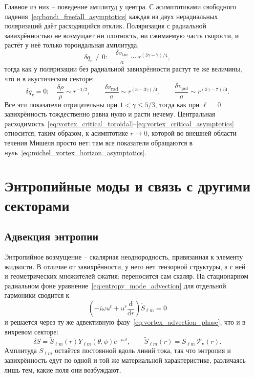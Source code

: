 \documentclass[12pt,a4paper,preprint,nopreprintline]{elsarticle}
\begin{document}
Главное из них -- поведение амплитуд у центра. С асимптотиками свободного падения~\eqref{eq:bondi_freefall_asymptotics} каждая из двух нерадиальных поляризаций даёт расходящийся отклик. Поляризация с радиальной завихрённостью не возмущает ни плотность, ни сжимаемую часть скорости, и растёт у неё только тороидальная амплитуда,
\begin{equation}
    \delta q_{r}\neq0:
    \quad
    \frac{\delta v_{\mathrm{tor}}}{a}
    \sim r^{(3\gamma-7)/4},
    \label{eq:vortex_critical_toroidal}
\end{equation}
тогда как у поляризации без радиальной завихрённости растут те же величины, что и в акустическом секторе:
\begin{equation}
    \delta q_{r}=0:
    \quad
    \frac{\delta\rho}{\rho}
    \sim r^{-1/2},
    \qquad
    \frac{\delta v_{\mathrm{rad}}}{a}
    \sim r^{(3-3\gamma)/4},
    \qquad
    \frac{\delta v_{\mathrm{pol}}}{a}
    \sim r^{(3\gamma-7)/4}.
    \label{eq:vortex_critical_asymptotics}
\end{equation}
Все эти показатели отрицательны при $1<\gamma\leq5/3$, тогда как при $\ell=0$ завихрённость тождественно равна нулю и расти нечему. Центральная расходимость~\eqref{eq:vortex_critical_toroidal}--\eqref{eq:vortex_critical_asymptotics} относится, таким образом, к асимптотике $r\rightarrow0$, которой во внешней области течения Мишеля просто нет: там все показатели обращаются в нуль~\eqref{eq:michel_vortex_horizon_asymptotics}.

\section{Энтропийные моды и связь с другими секторами}
\label{sec:entropy}

\subsection{Адвекция энтропии}
\label{sec:entropy_advection}

Энтропийное возмущение -- скалярная неоднородность, привязанная к элементу жидкости. В отличие от завихрённости, у него нет тензорной структуры, а с ней и геометрических множителей сжатия: переносится сам скаляр. На стационарном радиальном фоне уравнение~\eqref{eq:entropy_mode_advection} для отдельной гармоники сводится к
\begin{equation}
    \left(
        -i\omega u^{t}+u^{r}\frac{\mathrm{d}}{\mathrm{d}r}
    \right)\widetilde{S}_{\ell m}=0
\end{equation}
и решается через ту же адвективную фазу~\eqref{eq:vortex_advection_phase}, что и в вихревом секторе:
\begin{equation}
    \delta S
    =
    \widetilde{S}_{\ell m}(r)
    Y_{\ell m}(\theta,\phi)e^{-i\omega t},
    \qquad
    \widetilde{S}_{\ell m}(r)
    =
    S_{\ell m}\,
    \mathcal{P}_{\mathrm{v}}(r).
    \label{eq:entropy_advection_solution}
\end{equation}
Амплитуда $S_{\ell m}$ остаётся постоянной вдоль линий тока, так что энтропия и завихрённость едут по одной и той же материальной характеристике, различаясь лишь тем, какие поля они возбуждают.
\end{document}

